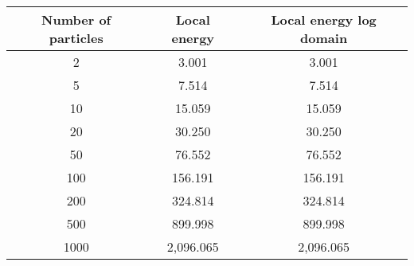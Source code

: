 \begin{tabular}{ccc}
\hline \hline
 Number of particles &  Local energy &  Local energy log domain \\
\hline \hline
                   2 &         3.001 &                    3.001 \\
                   5 &         7.514 &                    7.514 \\
                  10 &        15.059 &                   15.059 \\
                  20 &        30.250 &                   30.250 \\
                  50 &        76.552 &                   76.552 \\
                 100 &       156.191 &                  156.191 \\
                 200 &       324.814 &                  324.814 \\
                 500 &       899.998 &                  899.998 \\
                1000 &     2,096.065 &                2,096.065 \\
\hline \hline
\end{tabular}
